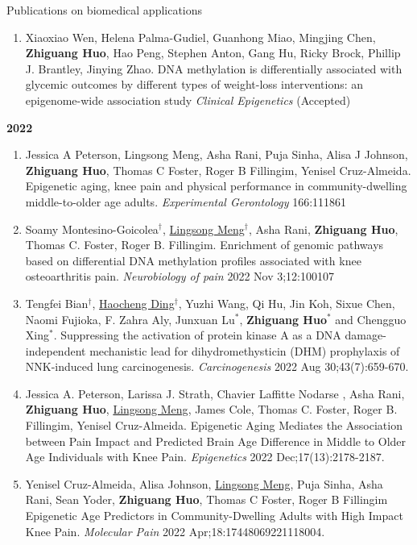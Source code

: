 \documentclass{resume} %
\begin{document}
\begin{rSection}{Publications on biomedical applications}
\begin{enumerate}[noitemsep,topsep=0pt, resume]
\item 
Xiaoxiao Wen, Helena Palma-Gudiel, Guanhong Miao, Mingjing Chen, {\bf Zhiguang Huo}, Hao Peng, Stephen Anton, Gang Hu, Ricky Brock, Phillip J. Brantley, Jinying Zhao.
DNA methylation is differentially associated with glycemic outcomes by different types of weight-loss interventions: an epigenome-wide association study
\emph{Clinical Epigenetics} (Accepted)




\end{enumerate}


\textbf{2022}
\begin{enumerate}[noitemsep,topsep=0pt, resume]

\item
Jessica A Peterson, Lingsong Meng, Asha Rani, Puja Sinha, Alisa J Johnson, {\bf Zhiguang Huo}, Thomas C Foster, Roger B Fillingim, Yenisel Cruz-Almeida.
Epigenetic aging, knee pain and physical performance in community-dwelling middle-to-older age adults.
\emph{Experimental Gerontology} 166:111861


\item Soamy Montesino-Goicolea$^\dagger$, \underline{Lingsong Meng}$^\dagger$, Asha Rani, {\bf Zhiguang Huo}, Thomas C. Foster, Roger B. Fillingim.
Enrichment of genomic pathways based on differential DNA methylation profiles associated with knee osteoarthritis pain.
\emph{Neurobiology of pain} 2022 Nov 3;12:100107



\item
Tengfei Bian$^\dagger$, \underline{Haocheng Ding}$^\dagger$, Yuzhi Wang, Qi Hu, Jin Koh, Sixue Chen, Naomi Fujioka, F. Zahra Aly, Junxuan Lu$^*$, {\bf Zhiguang Huo}$^*$ and Chengguo Xing$^*$.
Suppressing the activation of protein kinase A as a DNA damage-independent mechanistic lead for dihydromethysticin (DHM) prophylaxis of NNK-induced lung carcinogenesis.
\emph{Carcinogenesis} 2022 Aug 30;43(7):659-670.

\item
Jessica A. Peterson, Larissa J. Strath, Chavier Laffitte Nodarse , Asha Rani, {\bf Zhiguang Huo}, \underline{Lingsong Meng}, James Cole, Thomas C. Foster, Roger B. Fillingim, Yenisel Cruz-Almeida. 
Epigenetic Aging Mediates the Association between Pain Impact and Predicted Brain Age Difference in Middle to Older Age Individuals with Knee Pain.  
\emph{Epigenetics} 2022 Dec;17(13):2178-2187.

\item 
Yenisel Cruz-Almeida, Alisa Johnson, \underline{Lingsong Meng}, Puja Sinha, Asha Rani, Sean Yoder, {\bf Zhiguang Huo}, Thomas C Foster, Roger B Fillingim
Epigenetic Age Predictors in Community-Dwelling Adults with High Impact Knee Pain.
\emph{Molecular Pain} 2022 Apr;18:17448069221118004.


\end{enumerate}
\end{rSection}
\end{document}
